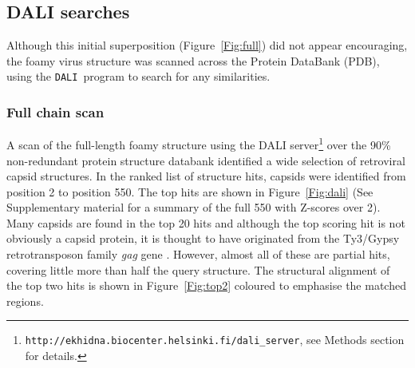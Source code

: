 \documentclass{bmcart}
\newcommand{\DALI}{{\tt DALI}}
\newcommand{\Fig}[1]{Figure~\ref{Fig:#1}}
\begin{document}
\subsection*{DALI searches}

Although this initial superposition (\Fig{full}) did not appear encouraging, the foamy virus structure
was scanned across the Protein DataBank (PDB), using the \DALI\ program \cite{HolmLet93a} to search for any similarities.

\subsubsection*{Full chain scan}

A scan of the full-length foamy structure using the DALI server\footnote{
{\tt http://ekhidna.biocenter.helsinki.fi/dali\_server},
see Methods section for details.
}
over the 90\% non-redundant protein structure databank
identified a wide selection of retroviral capsid structures.  In the ranked list of structure hits,
capsids were identified from position 2 to position 550.
The top hits are shown in \Fig{dali} (See Supplementary material for a summary of
the full 550 with Z-scores over 2).    Many capsids are found in the top 20 hits and although the top
scoring hit is not obviously a capsid protein, it is thought to have originated from the Ty3/Gypsy
retrotransposon family {\em gag} gene \cite{ZhangWet15}.   However, almost all of these are partial
hits, covering little more than half the query structure.   The structural alignment of the top two hits
is shown in \Fig{top2} coloured to emphasise the matched regions.
\end{document}
